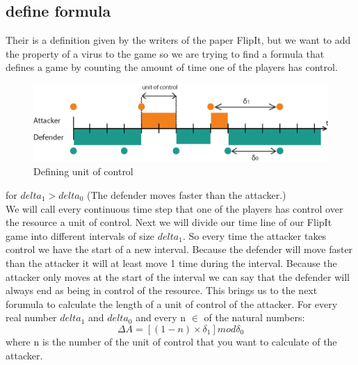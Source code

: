 \subsection{define formula}
Their is a definition given by the writers of the paper FlipIt, but we want to add the property of a virus to the game so we are trying to find a formula that defines a game by counting the amount of time one of the players has control. \\
\begin{figure}[hbtp]
\caption{Defining unit of control}
\centering
\includegraphics[scale=1]{Images/FlipSpel.png}
\end{figure}


%
%


for $delta_{1} > delta_{0}$ (The defender moves faster than the attacker.) \\

We will call every continuous time step that one of the players has control over the resource a unit of control. 
Next we will divide our time line of our FlipIt game into different intervals of size $delta_{1}$. So every time the attacker takes control we have the start of a new interval. Because the defender will move faster than the attacker it will at least move 1 time during the interval. Because the attacker only moves at the start of the interval we can say that the defender will always end as being in control of the resource. This brings us to the next forumula to calculate the length of a unit of control of the attacker. 
For every real number $delta_{1}$ and $delta_{0}$ and every n $\in$ of the natural numbers:
\begin{equation}\label{first}
\Delta A = [( 1- n  ) \times \delta_{1}] mod \delta_{0}
\end{equation}
where n is the number of the unit of control that you want to calculate of the attacker.\\

